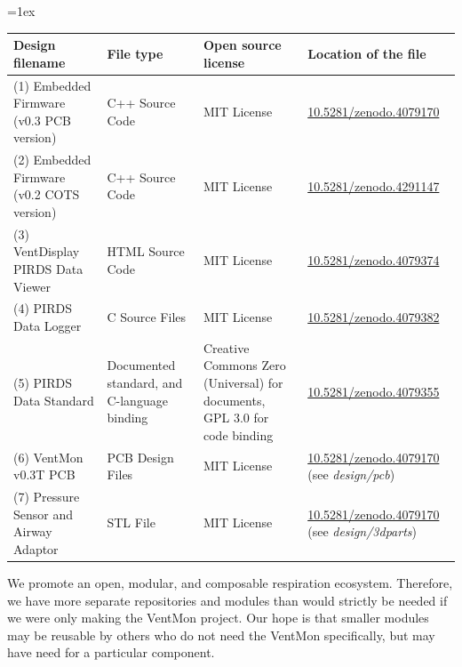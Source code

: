 \documentclass[11pt, letterpaper]{article}
\begin{document}
\tabulinesep=1ex
\begin{tabu} to \linewidth {|X[1.5]|X|X[1.5,1]|X[3]|}
\hline
\textbf{Design filename} & \textbf{File type} & \textbf{Open source license} & \textbf{Location of the file} \\\hline
(1) Embedded Firmware (v0.3 PCB version) & C++ Source Code & MIT License &  \href{https://doi.org/10.5281/zenodo.4079170}{10.5281/zenodo.4079170}\\\hline
(2) Embedded Firmware (v0.2 COTS version) & C++ Source Code & MIT License &  \href{https://doi.org/10.5281/zenodo.4291147}{10.5281/zenodo.4291147}\\\hline
(3) VentDisplay PIRDS Data Viewer  & HTML Source Code &  MIT License &  \href{http://doi.org/10.5281/zenodo.4079355}{10.5281/zenodo.4079374} \\\hline
(4) PIRDS Data Logger & C Source Files & MIT License & \href{https://doi.org/10.5281/zenodo.4079382}{10.5281/zenodo.4079382} \\\hline
(5) PIRDS Data Standard & Documented standard, and C-language binding & Creative Commons Zero (Universal) for documents, GPL 3.0 for code binding &
\href{http://doi.org/10.5281/zenodo.4079355}{10.5281/zenodo.4079355} \\\hline
(6) VentMon v0.3T PCB & PCB Design Files & MIT License &  \href{https://doi.org/10.5281/zenodo.4079170}{10.5281/zenodo.4079170} (see {\em design/pcb}) \\\hline
(7) Pressure Sensor and Airway Adaptor & STL File & MIT License &  \href{https://doi.org/10.5281/zenodo.4079170}{10.5281/zenodo.4079170} (see {\em design/3dparts}) \\\hline


\end{tabu}
\vspace{0.5cm}

We promote an open, modular, and composable respiration ecosystem. Therefore, we have more separate repositories and modules than would strictly be needed if we were only making the VentMon project. Our hope is that smaller modules may be reusable by others who do not need the VentMon specifically, but may have need for a particular component.
\end{document}
